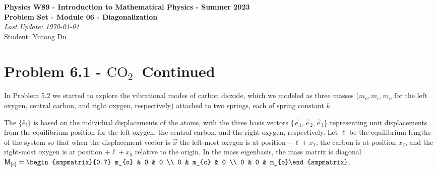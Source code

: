 \documentclass{article}
\def\OCO{$\textrm{CO}_{2}$}
\begin{document}
\addcopyright
\begin{center}
{\bf \large Physics W89 - Introduction to Mathematical Physics - Summer 2023}\\\medskip
{\bf \large Problem Set - Module 06 - Diagonalization} \\\medskip
{\emph{Last Update: \today}\\}
{ Student: Yutong Du} 
\end{center}


\dphline
\bigskip
\section*{Problem 6.1 - \OCO\ Continued}

\paragraph{}
In Problem 5.2 we started to explore the vibrational modes of carbon dioxide, which we modeled as three masses ($m_{o}, m_{c}, m_{o}$ for the left oxygen, central
carbon, and right oxygen, respectively) attached to two springs, each of spring constant $k$.\bigskip

The  $\{\hat{e}_{i}\}$ is based on the individual displacements of the atoms, with the three basis vectors $\{\vec{e}_{1},\vec{e}_{2},\vec{e}_{3}\}$ 
representing unit displacements from the equilibrium position for the left oxygen, the central carbon, and the right oxygen, respectively.
Let $\ell$ be the equilibrium lengths of the system so that when the displacement vector is $\vec{x}$ the left-most oxygen is at position $-\ell+x_{1}$, the carbon is at 
position $x_{2}$, and the right-most oxygen is at position $+\ell+x_{3}$ relative to the origin. 
In the mass eigenbasis, the mass matrix is diagonal $\mathsf{M}_{[e]} = \begin{smpmatrix}{0.7} m_{o} & 0 & 0 \\ 0 & m_{c} & 0 \\ 0 & 0 & m_{o}\end{smpmatrix}$.\bigskip
\end{document}
